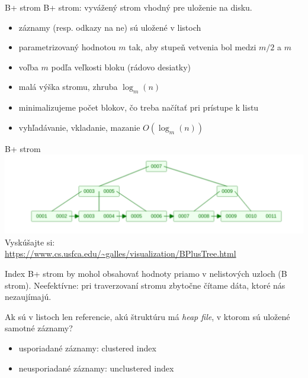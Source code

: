 \documentclass[12pt]{beamer}
\begin{document}
\begin{frame}[fragile]{B+ strom}
B+ strom: vyvážený strom vhodný pre uloženie na disku.
\begin{itemize}
\item záznamy (resp. odkazy na ne) sú uložené v listoch
\item parametrizovaný hodnotou $m$ tak, aby stupeň vetvenia bol medzi $m/2$ a $m$
\item voľba $m$ podľa veľkosti bloku (rádovo desiatky)
\item malá výška stromu, zhruba $\log_m (n)$
\item minimalizujeme počet blokov, čo treba načítať pri prístupe k listu
\item vyhľadávanie, vkladanie, mazanie $O(\log_m (n))$
\end{itemize}
\end{frame}

\begin{frame}[fragile]{B+ strom}
\includegraphics[scale=.25]{btree.png}\\
Vyskúšajte si:\\ {\scriptsize\url{https://www.cs.usfca.edu/~galles/visualization/BPlusTree.html}}
\end{frame}

\begin{frame}[fragile]{Index}
B+ strom by mohol obsahovať hodnoty priamo v nelistových uzloch (B strom).
Neefektívne: pri traverzovaní stromu zbytočne čítame dáta, ktoré nás nezaujímajú.
\bigskip

Ak sú v listoch len referencie, akú štruktúru má \emph{heap file}, v ktorom sú uložené samotné záznamy?
\begin{itemize}
\item usporiadané záznamy: \alert{clustered} index
\item neusporiadané záznamy: \alert{unclustered} index
\end{itemize}
\end{frame}
\end{document}
